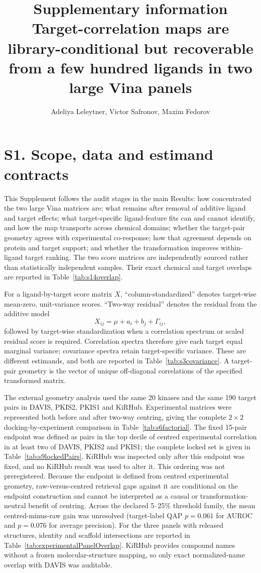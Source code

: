 \documentclass[11pt]{article}
\title{Supplementary information\\[4pt]\large Target-correlation maps are library-conditional
but recoverable from a few hundred ligands in two large Vina panels}
\author{Adeliya Leleytner, Victor Safronov, Maxim Fedorov}
\date{}
\begin{document}
\maketitle


\section*{S1. Scope, data and estimand contracts}

This Supplement follows the audit stages in the main Results: how concentrated the two
large Vina matrices are; what remains after removal of additive ligand and target effects;
what target-specific ligand-feature fits can and cannot identify, and how the map transports
across chemical domains;
whether the target-pair geometry agrees with experimental co-response; how that agreement
depends on protein and target support; and whether the transformation improves within-ligand
target ranking. The two score matrices are independently sourced rather than
statistically independent samples. Their exact chemical and target overlaps are reported in
Table~\ref{tab:s14overlap}.

For a ligand-by-target score matrix $X$, ``column-standardized'' denotes target-wise
mean-zero, unit-variance scores. ``Two-way residual'' denotes the residual from the additive
model
\[
X_{ij}=\mu+a_i+b_j+\Gamma_{ij},
\]
followed by target-wise standardization when a correlation spectrum or scaled residual score
is required. Correlation spectra therefore give each target equal marginal variance;
covariance spectra retain target-specific variance. These are different estimands, and both
are reported in Table~\ref{tab:s3covariance}. A target-pair geometry is the vector of unique
off-diagonal correlations of the specified transformed matrix.

The external geometry analysis used the same 20 kinases and the same 190 target pairs in
DAVIS, PKIS2, PKIS1 and KiRHub. Experimental matrices were represented both before and after
two-way centring, giving the complete $2\times2$ docking-by-experiment comparison in
Table~\ref{tab:s6factorial}. The fixed 15-pair endpoint was defined as pairs in the top decile
of centred experimental correlation in at least two of DAVIS, PKIS2 and PKIS1; the complete
locked set is given in Table~\ref{tab:s9lockedPairs}. KiRHub was inspected only after this
endpoint was fixed, and no KiRHub result was used to alter it. This ordering was not
preregistered. Because the endpoint is defined from centred experimental geometry,
raw-versus-centred retrieval gaps against it are conditional on the endpoint construction and
cannot be interpreted as a causal or transformation-neutral benefit of centring. Across the
declared 5--25\% threshold family,
the mean centred-minus-raw gain was unresolved (target-label QAP $p=0.061$ for AUROC and
$p=0.076$ for average precision).
For the three panels with released structures, identity and scaffold intersections are
reported in Table~\ref{tab:experimentalPanelOverlap}. KiRHub provides compound names without
a frozen molecular-structure mapping, so only exact normalized-name overlap with DAVIS was
auditable.
\end{document}
